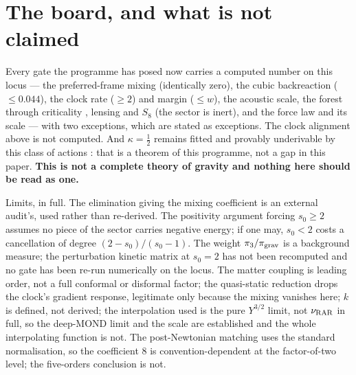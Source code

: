 \documentclass[11pt,letterpaper]{article}
\begin{document}
\section{The board, and what is not claimed}
Every gate the programme has posed now carries a computed number on this locus --- the preferred-frame mixing (identically zero), the cubic backreaction ($\le0.044$), the clock rate ($\ge2$) and margin ($\le w$), the acoustic scale, the forest through criticality \cite{paper20}, lensing and $S_8$ (the sector is inert), and the force law and its scale --- with two exceptions, which are stated as exceptions. The clock alignment above is not computed. And $\kappa=\tfrac12$ remains fitted and provably underivable by this class of actions \cite{repo}: that is a theorem of this programme, not a gap in this paper. \textbf{This is not a complete theory of gravity and nothing here should be read as one.}

Limits, in full. The elimination giving the mixing coefficient is an external audit's, used rather than re-derived. The positivity argument forcing $s_0\ge2$ assumes no piece of the sector carries negative energy; if one may, $s_0<2$ costs a cancellation of degree $(2-s_0)/(s_0-1)$. The weight $\pi_3/\pi_{\rm grav}$ is a background measure; the perturbation kinetic matrix at $s_0=2$ has not been recomputed and no gate has been re-run numerically on the locus. The matter coupling is leading order, not a full conformal or disformal factor; the quasi-static reduction drops the clock's gradient response, legitimate only because the mixing vanishes here; $k$ is defined, not derived; the interpolation used is the pure $Y^{3/2}$ limit, not $\nu_{\rm RAR}$ in full, so the deep-MOND limit and the scale are established and the whole interpolating function is not. The post-Newtonian matching uses the standard normalisation, so the coefficient $8$ is convention-dependent at the factor-of-two level; the five-orders conclusion is not.
\end{document}
